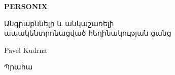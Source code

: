 \thispagestyle{empty}
\begin{center}
  {\sffamily\bfseries\fontsize{34}{40}\selectfont PERSONIX\par}
  \vspace{2.2em}
  {\rmfamily\large Անգրաքննելի և անկաշառելի\\[0.25em]
   ապակենտրոնացված հեղինակության ցանց\par}
\end{center}
\begin{center}
  {\rmfamily\Large Pavel Kudrna\par}
  \vspace{0.45em}
  {\rmfamily\small Պրահա\quad\textbullet{}\par}
\end{center}
\clearpage
